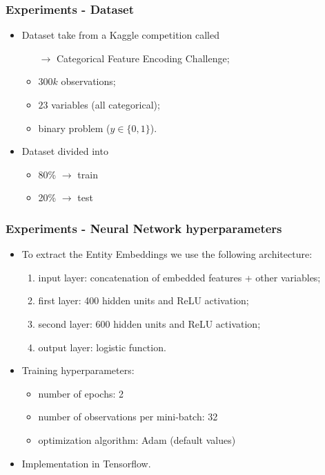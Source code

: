 \documentclass{beamer}
\begin{document}
\begin{frame}
    \frametitle{Experiments - Dataset}
    \begin{itemize}
        \item Dataset take from a Kaggle competition called
        \begin{itemize}
            \item[$\rightarrow$] Categorical Feature Encoding Challenge;
        \end{itemize}
        \begin{itemize}
            \item $300k$ observations;
            \item $23$ variables (all categorical);
            \item binary problem ($y \in \{0, 1\}$).
        \end{itemize}
        \medskip
        \item Dataset divided into
        \begin{itemize}
            \item 80\% $\rightarrow$ train
            \item 20\% $\rightarrow$ test
        \end{itemize}
    \end{itemize}
\end{frame}
\begin{frame}
    \frametitle{Experiments - Neural Network hyperparameters}
    \begin{itemize}
        \item To extract the Entity Embeddings we use the following architecture:
        \begin{enumerate}
            \item input layer: concatenation of embedded features + other variables;
            \item first layer: 400 hidden units and ReLU activation;
            \item second layer: 600 hidden units and ReLU activation;
            \item output layer: logistic function.
        \end{enumerate}
        \medskip
        \item Training hyperparameters:
        \begin{itemize}
            \item number of epochs: 2
            \item number of observations per mini-batch: 32
            \item optimization algorithm: Adam\cite{adam} (default values)
        \end{itemize}
        \medskip
        \item Implementation in Tensorflow\cite{tf}.
    \end{itemize}
\end{frame}
\end{document}
